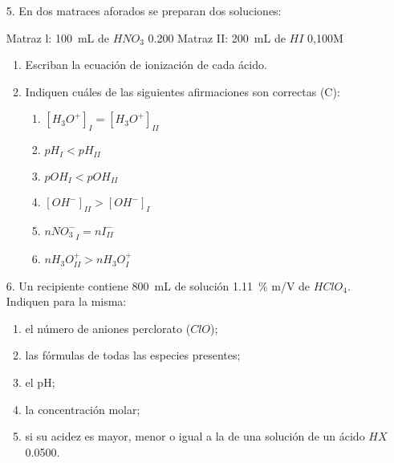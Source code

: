 \documentclass[../Práctica.root.tex]{subfiles}
\begin{document}
\begin{enumerate}
    \item[5.] En dos matraces aforados se preparan dos soluciones:

          Matraz l: \SI{100}{\mL} de $HNO_3$ \SI{0,200}{\MR}
          Matraz II: \SI{200}{\mL} de $HI$ 0,100M
          \begin{enumerate}
              \item Escriban la ecuación de ionización de cada ácido.
              \item Indiquen cuáles de las siguientes afirmaciones son correctas (C):
                    \begin{enumerate}
                        \item $[H_3O^+]_I = [H_3O^+]_{II}$
                        \item $pH_I < pH_{II}$
                        \item $pOH_I < pOH_{II}$
                        \item $[OH^-]_{II} > [OH^-]_I$
                        \item $n {NO_3^-}_I = nI^-_{II}$
                        \item $n H_3O^+_{II} > n H_3O^+_I$
                    \end{enumerate}
          \end{enumerate}

    \item[6.] Un recipiente contiene \SI{800}{\mL} de solución \SI{1,11}{\percent} m/V de $HClO_4$. Indiquen para la misma:
          \begin{enumerate}
              \item el número de aniones perclorato ($ClO$);
              \item las fórmulas de todas las especies presentes;
              \item el pH;
              \item la concentración molar;
              \item si su acidez es mayor, menor o igual a la de una solución de un ácido $HX$ \SI{0,0500}{\MR}.
          \end{enumerate}


\end{enumerate}
\end{document}
